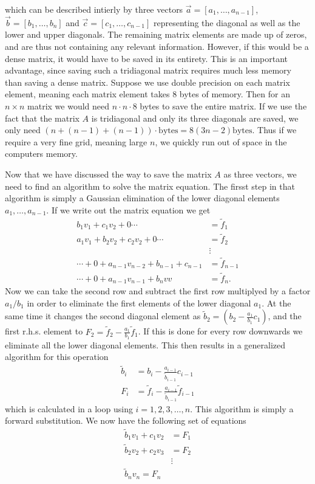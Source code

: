 \documentclass[twocolumn]{aastex62}
\begin{document}
which can be described intierly by three vectors $\vec{a} = [a_1,\ldots, a_{n-1}]$, $\vec{b} = [b_1,\ldots,b_n]$ and $\vec{c} = [c_1,\ldots,c_{n-1}]$ representing the diagonal as well as the lower and upper diagonals. The remaining matrix elements are made up of zeros, and are thus not containing any relevant information. However, if this would be a dense matrix, it would have to be saved in its entirety. This is an important advantage, since saving such a tridiagonal matrix requires much less memory than saving a dense matrix. Suppose we use double precision on each matrix element, meaning each matrix element takes 8 bytes of memory. Then for an $n\times n$ matrix we would need $n\cdot n\cdot 8$ bytes to save the entire matrix. If we use the fact that the matrix $A$ is tridiagonal and only its three diagonals are saved, we only need $\left(n + (n-1) + (n-1)\right) \cdot \text{bytes} = 8(3n - 2) \text{bytes}$. Thus if we require a very fine grid, meaning large $n$, we quickly run out of space in the computers memory. 

Now that we have discussed the way to save the matrix $A$ as three vectors, we need to find an algorithm to solve the matrix equation. The firsst step in that algorithm is simply a Gaussian elimination of the lower diagonal elements $a_1,\ldots, a_{n-1}$. If we write out the matrix equation we get 
\begin{align}
	b_1 v_1 + c_1v_2 + 0  \cdots &= \tilde{f}_1\\
	a_1 v_1 + b_2 v_2 + c_2 v_2 + 0 \cdots &= \tilde{f}_2\\
	&\vdots\\
	\cdots+0+a_{n-1} v_{n-2} + b_{n-1} + c_{n-1} &= \tilde{f}_{n-1}\\
	\cdots+0+a_{n-1}v_{n-1} + b_{n} v{v} &= \tilde{f}_n.
\end{align}
Now we can take the second row and subtract the first row multiplyed by a factor $a_1/b_1$ in order to eliminate the first elements of the lower diagonal $a_1$. At the same time it changes the second diagonal element as $\tilde{b}_2 = (b_2 - \frac{a_1}{b_1}c_1)$, and the first r.h.s. element to $F_2 = \tilde{f}_2 - \frac{a_1}{b_1}\tilde{f}_1$. If this is done for every row downwards we eliminate all the lower diagonal elements. This then results in a generalized algorithm for this operation
\begin{align}
	\tilde{b}_i &= b_i - \frac{a_{i-1}}{\tilde{b}_{i-1}}c_{i-1}\\
	F_i & = \tilde{f}_i - \frac{a_{i-1}}{\tilde{b}_{i-1}}\tilde{f}_{i - 1}
\end{align}
which is calculated in a loop using $i=1,2,3,\ldots, n$. This algorithm is simply a forward substitution. We now have the following set of equations
\begin{align}
	\tilde{b}_1v_1 + c_1v_2  &= F_1\\
	\tilde{b}_2v_2 + c_2v_3 &= F_2\\
	&\vdots\\
	\tilde{b}_nv_n = F_n	
\end{align}
\end{document}

